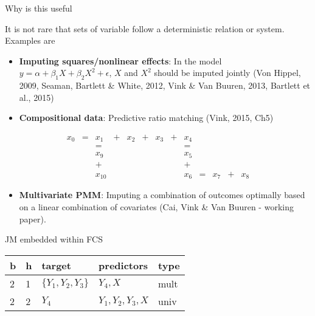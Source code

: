 \documentclass[ignorenonframetext,]{beamer}
\providecommand{\tightlist}{%
  \setlength{\itemsep}{0pt}\setlength{\parskip}{0pt}}
\begin{document}
\begin{frame}{Why is this useful}
\protect\hypertarget{why-is-this-useful}{}

It is not rare that sets of variable follow a deterministic relation or
system. Examples are

\begin{itemize}
\tightlist
\item
  \textbf{Imputing squares/nonlinear effects}: In the model
  \(y=\alpha + \beta_1X+\beta_2X^2 + \epsilon\), \(X\) and \(X^2\)
  should be imputed jointly (Von Hippel, 2009, Seaman, Bartlett \&
  White, 2012, Vink \& Van Buuren, 2013, Bartlett et al., 2015)
\item
  \textbf{Compositional data}: Predictive ratio matching (Vink, 2015,
  Ch5)
\end{itemize}

\[
\begin{array}{lllllllllllll}
x_0 &=  &x_1        &+  &x_2        &+      &x_3        &+& x_4 &       &   &   &\\
       &    &=      &       &           &       &       && =        &       &   &   &\\
       &    &x_9        &       &           &       &       && x_5  &       &   &   &\\
       &    &+      &       &           &       &       && +        &       &   &   &\\
       &    &x_{10}     &       &           &       &       &&x_6       &=      &x_7    &+&x_8
\end{array}
\]

\begin{itemize}
\tightlist
\item
  \textbf{Multivariate PMM}: Imputing a combination of outcomes
  optimally based on a linear combination of covariates (Cai, Vink \&
  Van Buuren - working paper).
\end{itemize}

\end{frame}

\begin{frame}{JM embedded within FCS}
\protect\hypertarget{jm-embedded-within-fcs}{}

\begin{longtable}[]{@{}lllll@{}}
\toprule
b & h & target & predictors & type\tabularnewline
\midrule
\endhead
2 & 1 & \(\{Y_1, Y_2, Y_3\}\) & \(Y_4, X\) & mult\tabularnewline
2 & 2 & \(Y_4\) & \(Y_1, Y_2, Y_3, X\) & univ\tabularnewline
\bottomrule
\end{longtable}

\end{frame}
\end{document}
